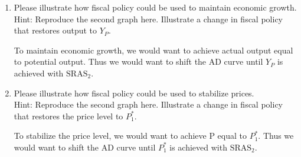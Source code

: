 \documentclass[
    letterpaper,paper=portrait,fleqn,
    DIV=16,fontsize=12pt,twoside=semi,
    parskip=full-,
    headings=standardclasses]
{scrartcl}
\begin{document}
\begin{enumerate}

\item \label{maintain-output} Please illustrate how fiscal policy could be used to maintain economic growth. \\ {\footnotesize Hint: Reproduce the second graph here. Illustrate a change in fiscal policy that restores output to $Y_P$.}

\begin{solution}
To maintain economic growth, we would want to achieve actual output equal to potential output. Thus we would want to shift the AD curve until $Y_P$ is achieved with $\text{SRAS}_2$.

\end{solution}

\item \label{maintain-prices} Please illustrate how fiscal policy could be used to stabilize prices. \\ {\footnotesize Hint: Reproduce the second graph here. Illustrate a change in fiscal policy that restores the price level to $P^*_1$.}

\begin{solution}
To stabilize the price level, we would want to achieve P equal to $P^*_1$. Thus we would want to shift the AD curve until $P^*_1$ is achieved with $\text{SRAS}_2$.


\end{solution}
\end{enumerate}
\end{document}
